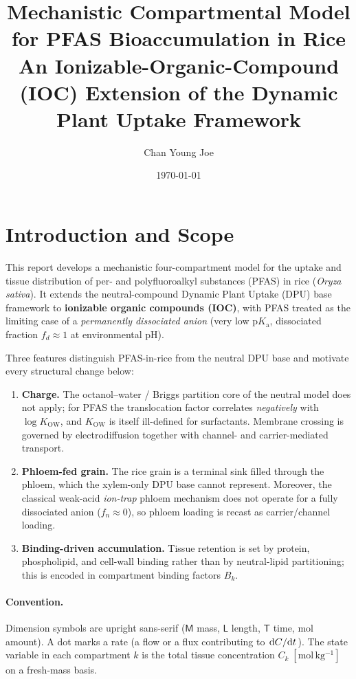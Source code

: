 \documentclass[12pt,a4paper]{article}
\title{\textbf{Mechanistic Compartmental Model for PFAS Bioaccumulation in Rice}\\[6pt]
\large An Ionizable-Organic-Compound (IOC) Extension of the Dynamic Plant Uptake Framework}
\author{Chan Young Joe}
\date{\today}
\newcommand{\dM}{\mathsf{M}}
\newcommand{\dL}{\mathsf{L}}
\newcommand{\dT}{\mathsf{T}}
\begin{document}
\maketitle
\tableofcontents
\newpage

\section{Introduction and Scope}

This report develops a mechanistic four-compartment model for the uptake and tissue distribution of per- and polyfluoroalkyl substances (PFAS) in rice (\emph{Oryza sativa}).  It extends the neutral-compound Dynamic Plant Uptake (DPU) base framework to \textbf{ionizable organic compounds (IOC)}, with PFAS treated as the limiting case of a \emph{permanently dissociated anion} (very low $\mathrm{p}K_\mathrm{a}$, dissociated fraction $f_d\approx1$ at environmental pH).

Three features distinguish PFAS-in-rice from the neutral DPU base and motivate every structural change below:
\begin{enumerate}[nosep]
    \item \textbf{Charge.} The octanol--water / Briggs partition core of the neutral model does not apply; for PFAS the translocation factor correlates \emph{negatively} with $\log K_\mathrm{OW}$, and $K_\mathrm{OW}$ is itself ill-defined for surfactants.  Membrane crossing is governed by electrodiffusion together with channel- and carrier-mediated transport.
    \item \textbf{Phloem-fed grain.} The rice grain is a terminal sink filled through the phloem, which the xylem-only DPU base cannot represent.  Moreover, the classical weak-acid \emph{ion-trap} phloem mechanism does not operate for a fully dissociated anion ($f_n\approx0$), so phloem loading is recast as carrier/channel loading.
    \item \textbf{Binding-driven accumulation.} Tissue retention is set by protein, phospholipid, and cell-wall binding rather than by neutral-lipid partitioning; this is encoded in compartment binding factors $B_k$.
\end{enumerate}

\paragraph{Convention.}  Dimension symbols are upright sans-serif ($\dM$ mass, $\dL$ length, $\dT$ time, $\mathrm{mol}$ amount).  A dot marks a rate (a flow or a flux contributing to $\dv*{C}{t}$).  The state variable in each compartment $k$ is the total tissue concentration $C_k\;[\mathrm{mol\,kg^{-1}}]$ on a fresh-mass basis.
\end{document}
